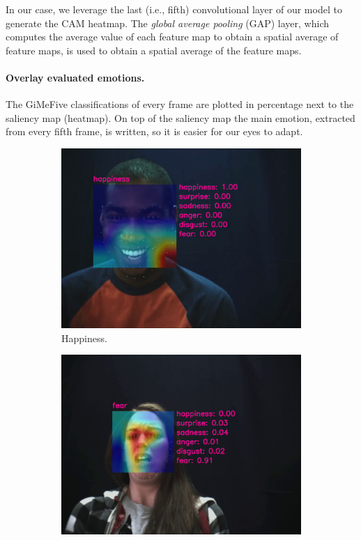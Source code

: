In our case, we leverage the last (i.e., fifth) convolutional layer of our model to generate the CAM heatmap. 
The \textit{global average pooling} (GAP) layer, 
which computes the average value of each feature map to obtain a spatial average of feature maps, 
is used to obtain a spatial average of the feature maps. 

\paragraph{Overlay evaluated emotions.} %
The GiMeFive classifications of every frame are plotted in percentage next to the saliency map (heatmap).
On top of the saliency map the main emotion, extracted from every fifth frame, is written, so it is easier for our eyes to adapt.

\begin{figure}[ht]
  \centering
  \begin{subfigure}{0.49\linewidth} %
    \includegraphics[width=\linewidth]{GiMeFive01.png}
    \caption{Happiness.}
    \label{fig:v1}
  \end{subfigure}
  \hfill
  \begin{subfigure}{0.49\linewidth}
    \includegraphics[width=\linewidth]{GiMeFive02.png}

\end{subfigure}
\end{figure}
